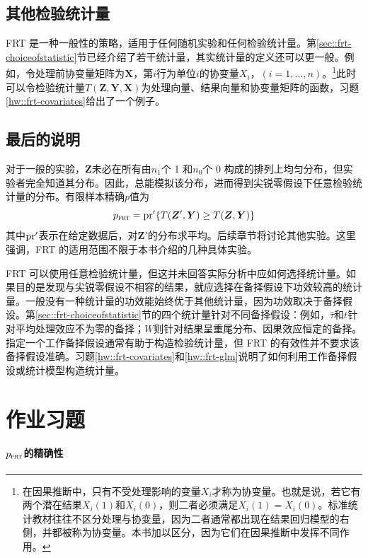 \subsection{其他检验统计量}\label{section::other-statistic}


FRT 是一种一般性的策略，适用于任何随机实验和任何检验统计量。第\ref{sec::frt-choiceofstatistic}节已经介绍了若干统计量，其实统计量的定义还可以更一般。例如，令处理前协变量矩阵为$\bm{X}$，第$i$行为单位$i$的协变量$X_i$，$(i = 1, \ldots, n)$。\footnote{在因果推断中，只有不受处理影响的变量$X_i$才称为协变量。也就是说，若它有两个潜在结果$X_i(1)$和$X_i(0)$，则二者必须满足$X_i(1) = X_i(0)$。标准统计教材往往不区分处理与协变量，因为二者通常都出现在结果回归模型的右侧，并都被称为协变量。本书加以区分，因为它们在因果推断中发挥不同作用。}此时可以令检验统计量$T(\bm{Z}, \bm{Y}, \bm{X})$为处理向量、结果向量和协变量矩阵的函数，习题\ref{hw::frt-covariates}给出了一个例子。 



\subsection{最后的说明}对于一般的实验，$\bm{Z}$未必在所有由$n_1$个 1 和$n_0$个 0 构成的排列上均匀分布，但实验者完全知道其分布。因此，总能模拟该分布，进而得到尖锐零假设下任意检验统计量的分布。有限样本精确$p$值为
$$
p_\textsc{frt} = \textup{pr}'\{  T(\bm{Z}', \bm{Y}) \geq T(\bm{Z}, \bm{Y}) \}
$$
其中$\textup{pr}'$表示在给定数据后，对$\bm{Z}'$的分布求平均。后续章节将讨论其他实验。这里强调，FRT 的适用范围不限于本书介绍的几种具体实验。 

 
FRT 可以使用任意检验统计量，但这并未回答实际分析中应如何选择统计量。如果目的是发现与尖锐零假设不相容的结果，就应选择在备择假设下功效较高的统计量。一般没有一种统计量的功效能始终优于其他统计量，因为功效取决于备择假设。第\ref{sec::frt-choiceofstatistic}节的四个统计量针对不同备择假设：例如，$\hat{\tau}$和$t$针对平均处理效应不为零的备择；$W$则针对结果呈重尾分布、因果效应恒定的备择。指定一个工作备择假设通常有助于构造检验统计量，但 FRT 的有效性并不要求该备择假设准确。习题\ref{hw::frt-covariates}和\ref{hw::frt-glm}说明了如何利用工作备择假设或统计模型构造统计量。 
 



\section{作业习题}



\paragraph{$p_{\textsc{frt}}$的精确性}
\label{hw::exact-frt}

